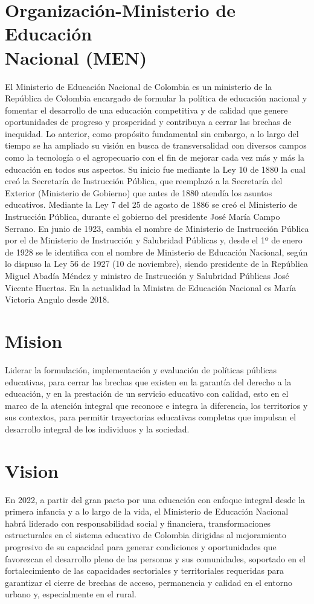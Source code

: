 \section{Organización-Ministerio de Educación \\ Nacional (MEN)}
El Ministerio de Educación Nacional de Colombia es un ministerio de la República de Colombia encargado de formular la política de educación nacional y fomentar el desarrollo de una educación competitiva y de calidad que genere oportunidades de progreso y prosperidad y contribuya a cerrar las brechas de inequidad. Lo anterior, como propósito fundamental sin embargo, a lo largo del tiempo se ha ampliado su visión en busca de transversalidad con diversos campos como la tecnología o el agropecuario con el fin de mejorar cada vez más y más la educación en todos sus aspectos.
Su inicio fue mediante la Ley 10 de 1880 la cual creó la Secretaría de Instrucción Pública, que reemplazó a la Secretaría del Exterior (Ministerio de Gobierno) que antes de 1880 atendía los asuntos educativos.
Mediante la Ley 7 del 25 de agosto de 1886 se creó el Ministerio de Instrucción Pública, durante el gobierno del presidente José María Campo Serrano.
En junio de 1923, cambia el nombre de Ministerio de Instrucción Pública por el de Ministerio de Instrucción y Salubridad Públicas y, desde el 1º de enero de 1928 se le identifica con el nombre de Ministerio de Educación Nacional, según lo dispuso la Ley 56 de 1927 (10 de noviembre), siendo presidente de la República Miguel Abadía Méndez y ministro de Instrucción y Salubridad Públicas José Vicente Huertas. En la actualidad la Ministra de Educación Nacional es María Victoria Angulo desde 2018.

\section{Mision}
Liderar la formulación, implementación y evaluación de políticas públicas educativas, para cerrar las brechas que existen en la garantía del derecho a la educación, y en la prestación de un servicio educativo con calidad, esto en el marco de la atención integral que reconoce e integra la diferencia, los territorios y sus contextos, para permitir trayectorias educativas completas que impulsan el desarrollo integral de los individuos y la sociedad.

\section{Vision}
En 2022, a partir del gran pacto por una educación con enfoque integral desde la primera infancia y a lo largo de la vida, el Ministerio de Educación Nacional habrá liderado con responsabilidad social y financiera, transformaciones estructurales en el sistema educativo de Colombia dirigidas al mejoramiento progresivo de su capacidad para generar condiciones y oportunidades que favorezcan el desarrollo pleno de las personas y sus comunidades, soportado en el fortalecimiento de las capacidades sectoriales y territoriales requeridas para garantizar el cierre de brechas de acceso, permanencia y calidad en el entorno urbano y, especialmente en el rural.


